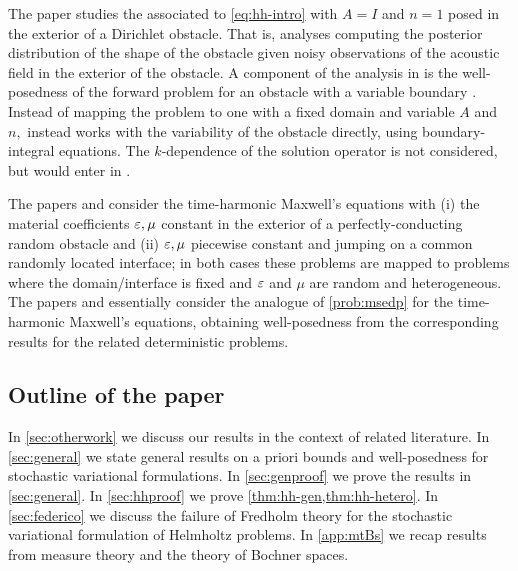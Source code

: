 The paper \cite{BuGh:14} studies the  associated to \eqref{eq:hh-intro} with $A=I$ and $n=1$  posed in the  exterior of a Dirichlet obstacle. That is, \cite{BuGh:14} analyses computing the posterior distribution of the shape of the obstacle given noisy observations of the acoustic field in the exterior of the obstacle. A component of the analysis in \cite{BuGh:14} is the well-posedness of the forward problem for an obstacle with a variable boundary \cite[Proposition 3.5]{BuGh:14}. Instead of mapping the problem to one with  a fixed domain and variable $A$ and $n,$ \cite{BuGh:14} instead works with the variability of the obstacle directly, using boundary-integral equations. The $k$-dependence of the solution operator is not considered, but would enter in \cite[Lemma 3.1]{BuGh:14}.


The papers \cite{JeScZe:17} and \cite{JeSc:16} consider the time-harmonic Maxwell's equations with (i) the material coefficients $\varepsilon,\mu$ constant in the exterior of a perfectly-conducting random obstacle and (ii) $\varepsilon,\mu$ piecewise constant and jumping on a common randomly located interface; in both cases these problems are mapped to problems where the domain/interface is fixed and $\varepsilon$ and $\mu$ are random and heterogeneous. The papers \cite{JeScZe:17} and \cite{JeSc:16} essentially consider the analogue of \cref{prob:msedp} for the time-harmonic Maxwell's equations, obtaining well-posedness from the corresponding results for the related deterministic problems.

\subsection{Outline of the paper} In \cref{sec:otherwork} we discuss our results in the context of related literature. In \cref{sec:general} we  state general results on a priori bounds and well-posedness for stochastic variational formulations. In \cref{sec:genproof} we prove the results in \cref{sec:general}. In \cref{sec:hhproof} we prove \cref{thm:hh-gen,thm:hh-hetero}. In \cref{sec:federico} we discuss the failure of Fredholm theory for the stochastic variational formulation of Helmholtz problems. In \cref{app:mtBs} we recap results from measure theory and the theory of Bochner spaces.